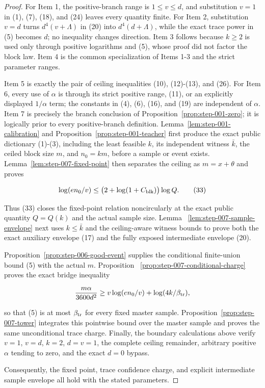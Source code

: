 \begin{proof}
For Item 1, the  positive-branch range is
\(1\le v\le d\), and substitution \(v=1\) in (1), (7), (18), and (24)
leaves every quantity finite. For Item 2, substitution \(v=d\) turns
\(d^4(v+\Lambda)\) in (20) into \(d^4(d+\Lambda)\), while the exact trace
power in (5) becomes \(d\); no inequality changes direction. Item 3 follows
because \(k\ge2\) is used only through positive logarithms and 
(5), whose proof did not factor the block law. Item 4 is the common
specialization of Items 1-3 and the strict parameter ranges.

Item 5 is exactly the pair of ceiling inequalities (10), (12)-(13), and
(26). For Item 6, every use of \(\alpha\) is through its strict positive
range, (11), or an explicitly displayed \(1/\alpha\) term; the constants in
(4), (6), (16), and (19) are independent of \(\alpha\). Item 7 is precisely
the branch conclusion of Proposition~\ref{prop:step-001-zero}; it is logically prior to every
positive-branch definition. 
Lemma~\ref{lem:step-001-calibration} and Proposition~\ref{prop:step-001-teacher} first produce the exact public
dictionary (1)-(3), including the least feasible \(k\), its independent
witness \(\bar k\), the ceiled block size \(m\), and \(n_0=km\), before a
sample or event exists. Lemma~\ref{lem:step-007-fixed-point} then separates
the ceiling as \(m=x+\theta\) and proves

\[
 \log(en_0/v)
 \le\bigl(2+\log(1+C_{\rm blk})\bigr)\log Q.
\tag{33}
\]

Thus (33) closes the fixed-point relation noncircularly at the exact public
quantity \(Q=Q(k)\) and the actual sample size. Lemma
~\ref{lem:step-007-sample-envelope} next uses \(k\le\bar k\) and the
 ceiling-aware witness bounds to prove both the exact auxiliary
envelope (17) and the fully exposed intermediate envelope (20).

Proposition~\ref{prop:step-006-good-event} supplies the conditional
finite-union bound (5) with the actual \(m\). Proposition
~\ref{prop:step-007-conditional-charge} proves the exact bridge inequality

\[
 \frac{m\alpha}{3600d^2}
 \ge v\log(en_0/v)+\log(4k/\beta_{\rm tr}),
\]

so that (5) is at most \(\beta_{\rm tr}\) for every fixed master sample.
Proposition~\ref{prop:step-007-tower} integrates this pointwise bound over
the master sample and proves the same unconditional trace charge. Finally,
the boundary calculations above verify \(v=1\), \(v=d\),
\(k=2\), \(d=v=1\), the complete ceiling remainder, arbitrary positive
\(\alpha\) tending to zero, and the exact \(d=0\) bypass.

Consequently, the fixed point, trace confidence charge, and explicit
intermediate sample envelope all hold with the stated parameters.



\end{proof}

